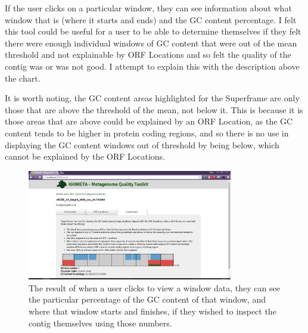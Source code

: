 If the user clicks on a particular window, they can see information about what window that is (where it starts and ends) and the GC content percentage. I felt this tool could be useful for a user to be able to determine themselves if they felt there were enough individual windows of GC content that were out of the mean threshold and not explainable by ORF Locations and so felt the quality of the contig was or was not good. I attempt to explain this with the description above the chart.

It is worth noting, the GC content areas highlighted for the Superframe are only those that are above the threshold of the mean, not below it. This is because it is those areas that are above could be explained by an ORF Location, as the GC content tends to be higher in protein coding regions, and so there is no use in displaying the GC content windows out of threshold by being below, which cannot be explained by the ORF Locations.

\begin{figure}[H]
	\centering
\includegraphics[width=0.8\textwidth]{images/ui9}
\caption{The result of when a user clicks to view a window data, they can see the particular percentage of the GC content of that window, and where that window starts and finishes, if they wished to inspect the contig themselves using those numbers.}
\end{figure}

